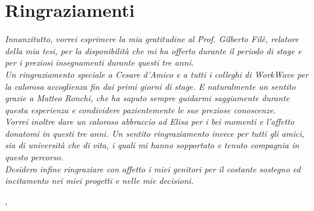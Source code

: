 \bigskip

\begingroup
\let\clearpage\relax
\let\cleardoublepage\relax
\let\cleardoublepage\relax

\chapter*{Ringraziamenti}

\noindent \textit{Innanzitutto, vorrei esprimere la mia gratitudine al Prof. Gilberto Filè, relatore della mia tesi, per la disponibilità che mi ha offerto durante il periodo di stage e per i preziosi insegnamenti durante questi tre anni.}\\

\noindent \textit{Un ringraziamento speciale a Cesare d'Amico e a tutti i colleghi di WorkWave per la calorosa accoglienza fin dai primi giorni di stage. E naturalmente un sentito grazie a Matteo Ronchi, che ha saputo sempre guidarmi saggiamente durante questa esperienza e condividere pazientemente le sue preziose conoscenze.}\\

\noindent \textit{Vorrei inoltre dare un caloroso abbraccio ad Elisa per i bei momenti e l'affetto donatomi in questi tre anni. Un sentito ringraziamento invece per tutti gli amici, sia di università che di vita, i quali mi hanno sopportato e tenuto compagnia in questo percorso.}\\

\noindent \textit{Desidero infine ringraziare con affetto i miei genitori per il costante sostegno ed incitamento nei miei progetti e nelle mie decisioni.}\\

\bigskip

\noindent\textit{\myLocation, \myTime}
\hfill \myName

\endgroup

